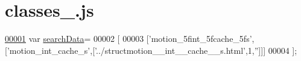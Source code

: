 \hypertarget{classes__5_8js_source}{}\section{classes\+\_.\+js}
\label{classes__5_8js_source}

\begin{DoxyCode}
\hypertarget{classes__5_8js_source.tex_l00001}{}\hyperlink{classes__5_8js_ad01a7523f103d6242ef9b0451861231e}{00001} var \hyperlink{classes__5_8js_ad01a7523f103d6242ef9b0451861231e}{searchData}=
00002 [
00003   [\textcolor{stringliteral}{'motion\_5fint\_5fcache\_5fs'},[\textcolor{stringliteral}{'motion\_int\_cache\_s'},[\textcolor{stringliteral}{'../structmotion\_\_int\_\_cache\_\_s.html'},1,\textcolor{stringliteral}{''}]]]
00004 ];
\end{DoxyCode}
